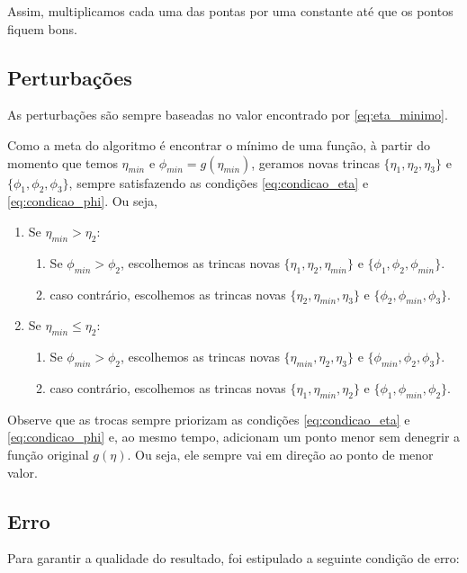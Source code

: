 \documentclass[12pt]{article}
\begin{document}
Assim, multiplicamos cada uma das pontas por uma constante até que os pontos fiquem bons.

\subsection{Perturbações}
\mbox{}

As perturbações são sempre baseadas no valor encontrado por \eqref{eq:eta_minimo}.

Como a meta do algoritmo é encontrar o mínimo de uma função, à partir do momento que temos $\eta_{min}$ e $\phi_{min} = g(\eta_{min})$, geramos novas trincas $\{\eta_1, \eta_2, \eta_3\}$ e $\{\phi_1, \phi_2, \phi_3\}$, sempre satisfazendo as condições \eqref{eq:condicao_eta} e \eqref{eq:condicao_phi}. Ou seja,

\begin{enumerate}
	\item Se $\eta_{min} > \eta_2$:
	\begin{enumerate}
		\item Se $\phi_{min} > \phi_2$, escolhemos as trincas novas $\{\eta_1, \eta_2, \eta_{min}\}$ e $\{\phi_1, \phi_2, \phi_{min}\}$.
		\item caso contrário, escolhemos as trincas novas $\{\eta_2, \eta_{min}, \eta_3\}$ e $\{\phi_2, \phi_{min}, \phi_3\}$.
	\end{enumerate}
	\item Se $\eta_{min} \leq \eta_2$:
	\begin{enumerate}
		\item Se $\phi_{min} > \phi_2$, escolhemos as trincas novas $\{\eta_{min}, \eta_2, \eta_3\}$ e $\{\phi_{min}, \phi_2, \phi_3\}$.
		\item caso contrário, escolhemos as trincas novas $\{\eta_1, \eta_{min}, \eta_2\}$ e $\{\phi_1, \phi_{min}, \phi_2\}$.
	\end{enumerate}
\end{enumerate}

Observe que as trocas sempre priorizam as condições \eqref{eq:condicao_eta} e \eqref{eq:condicao_phi} e, ao mesmo tempo, adicionam um ponto menor sem denegrir a função original $g(\eta)$. Ou seja, ele sempre vai em direção ao ponto de menor valor.

\subsection{Erro}
\mbox{}

Para garantir a qualidade do resultado, foi estipulado a seguinte condição de erro:
\end{document}
